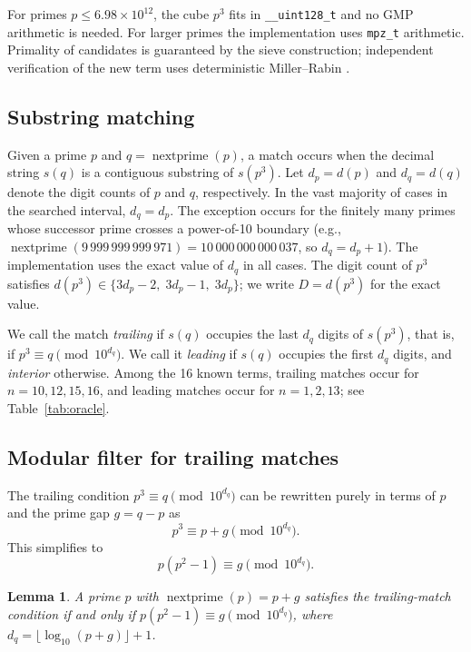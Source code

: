 \documentclass[11pt]{article}
\newtheorem{lemma}{Lemma}
\theoremstyle{definition}
\theoremstyle{remark}
\newcommand{\np}{\operatorname{nextprime}}
\begin{document}
For primes $p \leq 6.98 \times 10^{12}$, the cube $p^3$ fits in
\texttt{\_\_uint128\_t} and no GMP arithmetic is needed.
For larger primes the implementation uses \texttt{mpz\_t} arithmetic.
Primality of candidates is guaranteed by the sieve construction;
independent verification of the new term uses deterministic
Miller--Rabin \cite{CrandallPomerance2005}.

\subsection{Substring matching}
\label{sec:matching}

Given a prime $p$ and $q = \np(p)$, a match occurs when the decimal
string $s(q)$ is a contiguous substring of $s(p^3)$.
Let $d_p = d(p)$ and $d_q = d(q)$ denote the digit counts of $p$
and $q$, respectively.
In the vast majority of cases in the searched interval, $d_q = d_p$.
The exception occurs for the finitely many primes whose successor
prime crosses a power-of-10 boundary (e.g., $\np(9\,999\,999\,999\,971)
= 10\,000\,000\,000\,037$, so $d_q = d_p + 1$).
The implementation uses the exact value of $d_q$ in all cases.
The digit count of $p^3$ satisfies
$d(p^3) \in \{3d_p - 2,\; 3d_p - 1,\; 3d_p\}$;
we write $D = d(p^3)$ for the exact value.

We call the match \emph{trailing} if $s(q)$ occupies the last $d_q$
digits of $s(p^3)$, that is, if $p^3 \equiv q \pmod{10^{d_q}}$.
We call it \emph{leading} if $s(q)$ occupies the first $d_q$ digits,
and \emph{interior} otherwise.
Among the 16 known terms, trailing matches occur for $n = 10, 12, 15,
16$, and leading matches occur for $n = 1, 2, 13$;
see Table~\ref{tab:oracle}.

\subsection{Modular filter for trailing matches}
\label{sec:filter}

The trailing condition $p^3 \equiv q \pmod{10^{d_q}}$ can be rewritten
purely in terms of $p$ and the prime gap $g = q - p$ as
\begin{equation}
 p^3 \equiv p + g \pmod{10^{d_q}}.
\label{eq:trailing}
\end{equation}
This simplifies to
\begin{equation}
 p(p^2 - 1) \equiv g \pmod{10^{d_q}}.
\label{eq:filter}
\end{equation}

\begin{lemma}
\label{lem:filter}
A prime $p$ with $\np(p) = p + g$ satisfies the trailing-match
condition if and only if $p(p^2 - 1) \equiv g \pmod{10^{d_q}}$,
where $d_q = \lfloor \log_{10}(p + g) \rfloor + 1$.
\end{lemma}
\end{document}

